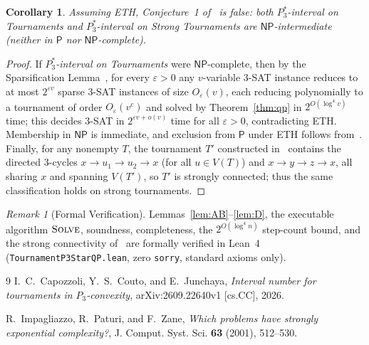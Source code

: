 \documentclass[11pt]{article}
\newtheorem{corollary}[theorem]{Corollary}
\theoremstyle{remark}
\newtheorem{remark}[theorem]{Remark}
\begin{document}
\begin{corollary}\label{cor:eth}
Assuming ETH, Conjecture~1 of~\cite{CCJ2026} is false: both \emph{$P_3^*$-interval on Tournaments} and \emph{$P_3^*$-interval on Strong Tournaments} are $\mathsf{NP}$-intermediate (neither in $\mathsf{P}$ nor $\mathsf{NP}$-complete).
\end{corollary}

\begin{proof}
If \emph{$P_3^*$-interval on Tournaments} were $\mathsf{NP}$-complete, then by the Sparsification Lemma~\cite{IPZ2001}, for every $\varepsilon > 0$ any $v$-variable $3$-SAT instance reduces to at most $2^{\varepsilon v}$ sparse $3$-SAT instances of size $O_\varepsilon(v)$, each reducing polynomially to a tournament of order $O_\varepsilon(v^c)$ and solved by Theorem~\ref{thm:qp} in $2^{O(\log^4 v)}$ time; this decides $3$-SAT in $2^{\varepsilon v + o(v)}$ time for all $\varepsilon > 0$, contradicting ETH. Membership in $\mathsf{NP}$ is immediate, and exclusion from $\mathsf{P}$ under ETH follows from~\cite[Corollary~3]{CCJ2026}. Finally, for any nonempty $T$, the tournament $T'$ constructed in~\cite[Theorem~4.1]{CCJ2026} contains the directed $3$-cycles $x \to u_1 \to u_2 \to x$ (for all $u \in V(T)$) and $x \to y \to z \to x$, all sharing $x$ and spanning $V(T')$, so $T'$ is strongly connected; thus the same classification holds on strong tournaments.
\end{proof}

\begin{remark}[Formal Verification]
Lemmas~\ref{lem:AB}--\ref{lem:D}, the executable algorithm $\textsc{Solve}$, soundness, completeness, the $2^{O(\log^4 n)}$ step-count bound, and the strong connectivity of~\cite[Theorem~4.1]{CCJ2026} are formally verified in Lean~4 (\texttt{TournamentP3StarQP.lean}, zero \texttt{sorry}, standard axioms only).
\end{remark}

\begin{thebibliography}{9}
I.~C.~Capozzoli, Y.~S.~Couto, and E.~Junchaya, \emph{Interval number for tournaments in $P_3$-convexity}, arXiv:2609.22640v1 [cs.CC], 2026.

R.~Impagliazzo, R.~Paturi, and F.~Zane, \emph{Which problems have strongly exponential complexity?}, J. Comput. Syst. Sci. \textbf{63} (2001), 512--530.
\end{thebibliography}
\end{document}
